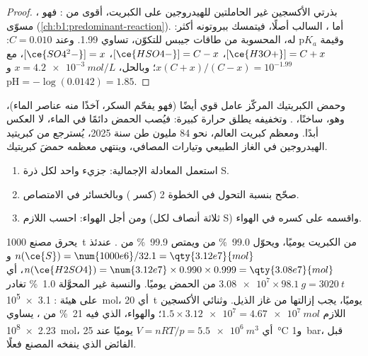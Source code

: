 \begin{proof}
، بذرتي الأكسجين غير الحاملتين للهيدروجين على الكبريت، 
أقوى من : فهو مسوّى (\cref{ch:b1:predominant-reaction}).
أما ، السالب أصلًا، فيتمسك ببروتونه أكثر: وقيمة $\mathrm{p}K_a$ له،
المحسوبة من طاقات جيبس للتكوّن، تساوي 1.99. وعند $C = 0.010$:
$[\ce{H3O+}] = C + x$، $[\ce{HSO4-}] = C - x$، $[\ce{SO4^2-}] = x$، مع
$x(C + x)/(C - x) = 10^{-1.99}$؛ وبالحل، $x = \qty{4.2e-3}{mol/L}$
و$\mathrm{pH} = -\log(0.0142) = 1.85$.
\end{proof}

وحمض الكبريتيك المركّز عامل  قوي أيضًا (فهو يفحّم
السكر، آخذًا منه عناصر الماء)، وهو، ساخنًا، . وتخفيفه
يطلق حرارة كبيرة: فيُصب الحمض دائمًا في الماء، لا
العكس أبدًا. ومعظم كبريت العالم، نحو 84 مليون طن سنة 2025،
يُسترجع من كبريتيد الهيدروجين في الغاز الطبيعي وتيارات المصافي،
وينتهي معظمه حمضَ كبريتيك.

\begin{method}\label{met:b1:p-block-16-18:contact-balance}
\begin{enumerate}
  \item استعمل المعادلة الإجمالية: جزيء  واحد لكل ذرة S.
  \item صحّح بنسبة التحول في الخطوة 2 (كسر 
        ) وبالخسائر في الامتصاص.
  \item ومن أجل الهواء: احسب  اللازم (ثلاثة أنصاف لكل S)
        واقسمه على كسره في الهواء.
\end{enumerate}
\end{method}

\begin{example}
يحرق مصنع \qty{1000}{t} من الكبريت يوميًا، ويحوّل \qty{99.0}{\percent}
من  ويمتص \qty{99.9}{\percent} من . عندئذ
$n(\ce{S}) = \num{1000e6}/32.1 = \qty{3.12e7}{mol}$
و$n(\ce{H2SO4}) = \num{3.12e7} \times 0.990 \times 0.999
= \qty{3.08e7}{mol}$، أي $\num{3.08e7} \times \qty{98.1}{g}
= \qty{3020}{t}$ من الحمض يوميًا. والنسبة غير المحوَّلة \qty{1.0}{\percent} تغادر
على هيئة : \qty{3.1e5}{mol}، أي \qty{20}{t} يوميًا، يجب إزالتها
من غاز الذيل. وثنائي الأكسجين اللازم $1.5 \times \num{3.12e7} =
\qty{4.67e7}{mol}$؛ والهواء، الذي فيه \qty{21}{\percent} من ، يساوي
\qty{2.23e8}{mol}، أي $V = nRT/p = \qty{5.5e6}{m^3}$ يوميًا عند
\qty{25}{\celsius} و\qty{1}{bar}، قبل الفائض الذي ينفخه المصنع
فعلًا.
\end{example}

